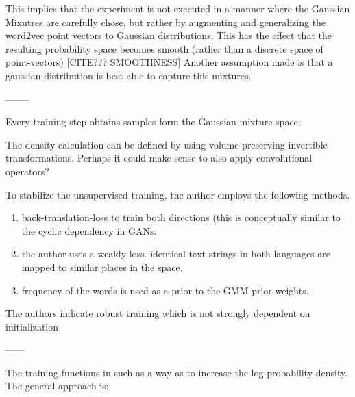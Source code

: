 \documentclass[a4paper,12pt,twoside,openright]{report}
\begin{document}
This implies that the experiment is not executed in a manner where the Gaussian Mixutres are carefully chose, but rather by augmenting and generalizing the word2vec point vectors to Gaussian distributions.
This has the effect that the resulting probability space becomes smooth (rather than a discrete space of point-vectors) [CITE??? SMOOTHNESS]
Another assumption made is that a gaussian distribution is best-able to capture this mixtures.

--------

Every training step obtains samples form the Gaussian mixture space.

The density calculation can be defined by using volume-preserving invertible transformations. 
Perhaps it could make sense to also apply convolutional operators?

To stabilize the unsupervised training, the author employs the following methods.

\begin{enumerate}
\item back-translation-loss to train both directions (this is conceptually similar to the cyclic dependency in GANs.
\item  the author uses a weakly loss. identical text-strings in both languages are mapped to similar places in the space. 
\item frequency of the words is used as a prior to the GMM prior weights.
\end{enumerate}

The authors indicate robust training which is not strongly dependent on initialization


------

The training functions in such as a way as to increase the log-probability density.
The general approach is:
\end{document}

